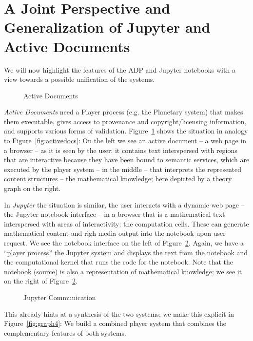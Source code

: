 \section{A Joint Perspective and Generalization of Jupyter and Active
  Documents}\label{sec:comparison}

We will now highlight the features of the ADP and Jupyter notebooks with a view towards a
possible unification of the systems.

\begin{figure}[ht]
  
  \caption{Active Documents}\label{fig:graph2}
\end{figure}

\emph{Active Documents} need a Player process (e.g. the Planetary system) that makes them
executable, gives access to provenance and copyright/licensing information, and supports
various forms of validation. Figure~\ref{fig:graph2} shows the situation in analogy to
Figure~\ref{fig:activedocs}: On the left we see an active document -- a web page in a
browser -- as it is seen by the user: it contains text interspersed with regions that are
interactive because they have been bound to semantic services, which are executed by the
player system -- in the middle -- that interprets the represented content structures --
the mathematical knowledge; here depicted by a theory graph on the right.


In \emph{Jupyter} the situation is similar, the user interacts with a dynamic web page --
the Jupyter notebook interface -- in a browser that is a mathematical text interspersed
with areas of interactivity: the computation cells. These can generate mathematical
content and righ media output into the notebook upon user request. We see the notebook
interface on the left of Figure~\ref{fig:graph3}. Again, we have a ``player process'' the
Jupyter system and displays the text from the notebook and the computational kernel that
runs the code for the notebook. Note that the notebook (source) is also a representation
of mathematical knowledge; we see it on the right of Figure~\ref{fig:graph3}.

\begin{figure}[ht]
  
  \caption{Jupyter Communication}\label{fig:graph3}
\end{figure}

This already hints at a synthesis of the two systems; we make this explicit in
Figure~\ref{fig:graph4}: We build a combined player system that combines the complementary
features of both systems. 


